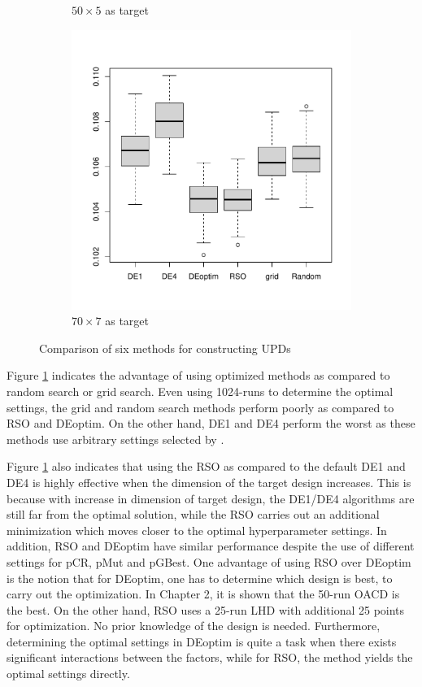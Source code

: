 \documentclass [PhD] {package/uclathes}
\begin{document}
\begin{figure}
\begin{subfigure}[b]{0.3\textwidth}
         \caption{$50\times 5$ as target}
     \end{subfigure}
     \hfill
     \begin{subfigure}[b]{0.3\textwidth}
         \centering
         \includegraphics[width=\textwidth]{chapters/RSO/pdfs/boxplots4}
         \caption{$70\times 7$ as target}
     \end{subfigure}
        \caption{Comparison of six methods for constructing UPDs}
        \label{fig:6methods}
\end{figure}

Figure \ref{fig:6methods} indicates the advantage of using optimized methods as compared to random search or grid search. Even using 1024-runs to determine the optimal settings, the grid and random search methods perform poorly as compared to RSO and DEoptim. On the other hand, DE1 and DE4 perform the worst as these methods use arbitrary settings selected by \textcite{stokes2023metaheuristic}.

Figure \ref{fig:6methods} also indicates that using the RSO as compared to the default DE1 and DE4 is highly effective when the dimension of the target design increases. This is because with increase in dimension of target design, the DE1/DE4 algorithms are still far from the optimal solution, while the RSO carries out an additional minimization which moves closer to the optimal hyperparameter settings. In addition, RSO and DEoptim have similar performance despite the use of different settings for pCR, pMut and pGBest. One advantage of using RSO over DEoptim is the notion that for DEoptim, one has to determine which design is best, to carry out the optimization. In Chapter 2, it is shown that the 50-run OACD is the best. On the other hand, RSO uses a 25-run LHD with additional 25 points for optimization. No prior knowledge of the design is needed. Furthermore, determining the optimal settings in DEoptim is quite a task when there exists significant interactions between the factors, while for RSO, the method yields the optimal settings directly.
\end{document}
